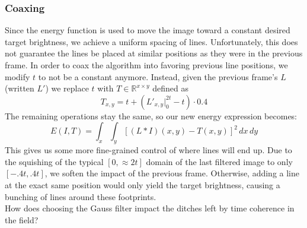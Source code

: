 \subsubsection*{Coaxing}
Since the energy function is used to move the image toward a constant desired target brightness, we achieve a uniform spacing of lines.
Unfortunately, this does not guarantee the lines be placed at similar positions as they were in the previous frame.
In order to coax the algorithm into favoring previous line positions, we modify $t$ to not be a constant anymore.
Instead, given the previous frame's $L$ (written $L'$) we replace $t$ with $T\in\mathbb{R}^{x\times y}$ defined as 
\begin{equation*}
    T_{x,y} = t + \left(L'_{x,y}\bigg|_0^{2t} - t\right) \cdot 0.4
\end{equation*}
The remaining operations stay the same, so our new energy expression becomes:
\[E(I, T) = \int_x\int_y\left[(L\ast I)(x,y)-T(x,y)\right]^2\,dx\,dy\]
This gives us some more fine-grained control of where lines will end up.
Due to the squishing of the typical $[0, \approx2t]$ domain of the last filtered image to only $[-.4t, .4t]$,
we soften the impact of the previous frame.
Otherwise, adding a line at the exact same position would only yield the target brightness,
causing a bunching of lines around these footprints.\\
How does choosing the Gauss filter impact the ditches left by time coherence in the field? 

